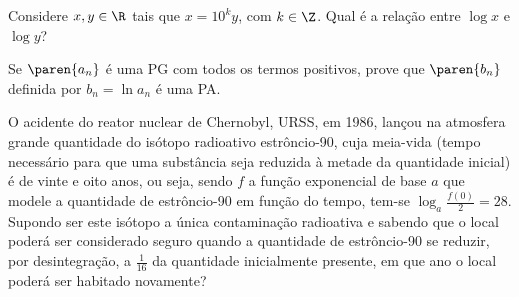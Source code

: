 \begin{exercise}
    Considere $x, y \in \R$ tais que $x = 10^k y$, com $k\in \Z$.
Qual é a relação entre $\log x $ e $\log y$?
\end{exercise}

\begin{exercise}
    Se $\paren{a_n}$ é uma PG com todos os termos positivos, prove
que $\paren{ b_n}$ definida por $b_n = \ln{a_n}$ é uma PA.
\end{exercise}

\begin{exercise}
    O acidente do reator nuclear de Chernobyl, URSS, em 1986, lançou
na atmosfera grande quantidade do isótopo radioativo estrôncio-90,
cuja meia-vida (tempo necessário para que uma substância seja
reduzida à metade da quantidade inicial) é de vinte e oito anos, ou
seja, sendo $f$  a função exponencial de base $a$ que modele a
quantidade de estrôncio-90 em função do tempo, tem-se $\log_a \frac
{f(0)} 2 = 28$. Supondo ser este isótopo a única contaminação
radioativa e sabendo que o local poderá ser considerado seguro
quando a quantidade de estrôncio-90 se reduzir, por desintegração, a
$\frac 1 {16}$ da quantidade inicialmente presente, em que ano o
local poderá ser habitado novamente?
\end{exercise}
